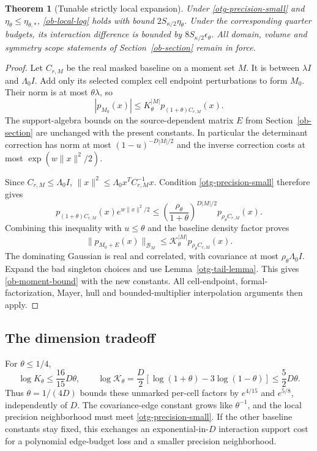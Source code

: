 \documentclass[11pt]{article}
\newtheorem{theorem}{Theorem}[section]
\theoremstyle{remark}
\begin{document}
\begin{theorem}[Tunable strictly local expansion]\label{otg-strict-theorem}
Under \eqref{otg-precision-small} and
$\mathcal\eta_\theta\le\mathcal\eta_{\theta,*}$,
\eqref{ob-local-log} holds with bound
$2S_{\kappa/2}\mathcal\eta_\theta$.
Under the corresponding quarter budgets, its interaction
difference is bounded by
$8S_{\kappa/2}\mathcal\epsilon_\theta$.
All domain, volume and symmetry scope statements of
Section~\ref{ob-section} remain in force.
\end{theorem}
\begin{proof}
Let $C_{r,M}$ be the real masked baseline on a moment set $M$.
It is between $\lambda I$ and $\Lambda_0I$.
Add only its selected complex cell endpoint perturbations to
form $M_0$. Their norm is at most $\theta\lambda$, so
\[
 |p_{M_0}(x)|
          \le K_\theta^{|M|}p_{(1+\theta)C_{r,M}}(x).
\]
The support-algebra bounds on the source-dependent matrix
$E$ from Section~\ref{ob-section} are unchanged with the
present constants. In particular the determinant correction
has norm at most $(1-u)^{-D|M|/2}$ and the inverse correction
costs at most $\exp(w\|x\|^2/2)$.

Since $C_{r,M}\le\Lambda_0I$,
$\|x\|^2\le\Lambda_0x^TC_{r,M}^{-1}x$.
Condition \eqref{otg-precision-small} therefore gives
\[
 p_{(1+\theta)C_{r,M}}(x)e^{w\|x\|^2/2}
 \le\left(\frac{\rho_\theta}{1+\theta}\right)^{D|M|/2}
                                  p_{\rho_\theta C_{r,M}}(x).
\]
Combining this inequality with $u\le\theta$ and the
baseline density factor proves
\begin{equation}\label{otg-algebra-density}
 \|p_{M_0+E}(x)\|_{\mathcal B_M}
       \le\mathcal K_\theta^{|M|}
                                  p_{\rho_\theta C_{r,M}}(x).
\end{equation}
The dominating Gaussian is real and correlated, with
covariance at most $\rho_\theta\Lambda_0I$.
Expand the bad singleton choices and use
Lemma~\ref{otg-tail-lemma}. This gives
\eqref{ob-moment-bound} with the new constants.
All cell-endpoint, formal-factorization, Mayer, hull and
bounded-multiplier interpolation arguments then apply.
\end{proof}

\subsection{The dimension tradeoff}

For $\theta\le1/4$,
\[
 \log K_\theta\le\frac{16}{15}D\theta,\qquad
 \log\mathcal K_\theta
 =\frac D2[\log(1+\theta)-3\log(1-\theta)]
                   \le\frac52D\theta .
\]
Thus $\theta=1/(4D)$ bounds these unmarked per-cell factors
by $e^{4/15}$ and $e^{5/8}$, independently of $D$.
The covariance-edge constant grows like $\theta^{-1}$,
and the local precision neighborhood must meet
\eqref{otg-precision-small}. If the other baseline constants
stay fixed, this exchanges an exponential-in-$D$ interaction
support cost for a polynomial edge-budget loss and a smaller
precision neighborhood.
\end{document}

